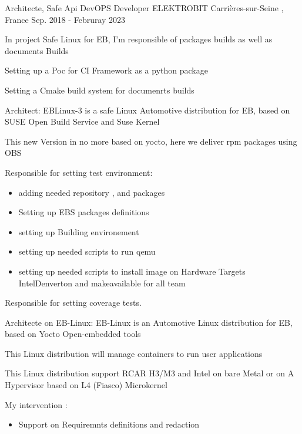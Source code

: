 \documentclass[11pt, a4paper]{awesome-cv} %
\begin{document}
\begin{cventries}
 \cventry
    {Architecte, Safe Api DevOPS Developer} %
    {ELEKTROBIT} %
    {Carrières-sur-Seine , France} %
    {Sep. 2018 - Februray 2023} %
    { %
        \begin{cvitems}
            \item {In project Safe Linux for EB, I'm responsible of packages builds as well as documents Builds}
            \item {Setting up a Poc for CI Framework as a python package}
            \item {Setting a Cmake build system for documenrts builds}
            \item {Architect: EBLinux-3 is a safe Linux Automotive distribution for EB, based on SUSE Open Build Service and Suse Kernel}
            \item {This new Version in no more based on yocto, here we deliver rpm packages using OBS}
            \item {Responsible for setting test environment:}
            \begin{itemize}
                \item adding needed repository , and packages
                \item Setting up EBS packages definitions
                \item setting up Building environement
                \item setting up needed scripts to run qemu
                \item setting up needed scripts to install image  on Hardware Targets IntelDenverton and makeavailable for all team
              \end{itemize}
            \item {Responsible for setting coverage tests.}
            \item {Architecte on EB-Linux: EB-Linux is an Automotive Linux distribution for EB, based on Yocto Open-embedded tools}
            \item {This Linux distribution will manage containers to run user applications }
            \item {This Linux distribution support RCAR H3/M3 and Intel on bare Metal or on A Hypervisor based on L4 (Fiasco) Microkernel}
            \item {My intervention :}
            \begin{itemize}
                \item Support on Requiremnts definitions and redaction

\end{itemize}
\end{cvitems}}
\end{cventries}
\end{document}
